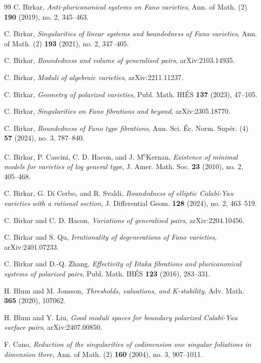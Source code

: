 \documentclass[11pt,reqno]{amsart}
\numberwithin{equation}{section}
\theoremstyle{definition}
\begin{document}
\begin{thebibliography}{99}
 C. Birkar, \textit{Anti-pluricanonical systems on Fano varieties}, Ann. of Math. (2) \textbf{190} (2019), no. 2, 345--463.

 C. Birkar, \textit{Singularities of linear systems and boundedness of Fano varieties}, Ann. of Math. (2) \textbf{193} (2021), no. 2, 347--405.

 C. Birkar, \textit{Boundedness and volume of generalised pairs}, arXiv:2103.14935.

 C. Birkar, \textit{Moduli of algebraic varieties}, arXiv:2211.11237.

 C. Birkar, \textit{Geometry of polarized varieties}, Publ. Math. IH\'ES \textbf{137} (2023), 47--105.

 C. Birkar, \textit{Singularities on Fano fibrations and beyond}, arXiv:2305.18770.

 C. Birkar, \textit{Boundedness of Fano type fibrations}, Ann. Sci. \'Ec. Norm. Sup\'er. (4) \textbf{57} (2024), no. 3, 787--840.

 C. Birkar, P. Cascini, C. D. Hacon, and J. M\textsuperscript{c}Kernan, \textit{Existence of minimal models for varieties of log general type}, J. Amer. Math. Soc. \textbf{23} (2010), no. 2, 405--468.

 C. Birkar, G. Di Cerbo, and R. Svaldi, \textit{Boundedness of elliptic Calabi-Yau varieties with a rational section}, J. Differential Geom. \textbf{128} (2024), no. 2, 463--519.

 C. Birkar and C. D. Hacon, \textit{Variations of generalised pairs}, arXiv:2204.10456.

 C. Birkar and S. Qu, \textit{Irrationality of degenerations of Fano varieties}, arXiv:2401.07233.

 C. Birkar and D.-Q. Zhang, \textit{Effectivity of Iitaka fibrations and pluricanonical systems of polarized pairs}, Publ. Math. IH\'ES \textbf{123} (2016), 283--331.

 H. Blum and M. Jonsson, \textit{Thresholds, valuations, and K-stability}, Adv. Math. \textbf{365} (2020), 107062.

 H. Blum and Y. Liu, \textit{Good moduli spaces for boundary polarized Calabi-Yau surface pairs}, arXiv:2407.00850.

 F. Cano, \textit{Reduction of the singularities of codimension one singular foliations in dimension three}, Ann. of Math. (2) \textbf{160} (2004), no. 3, 907--1011.


\end{thebibliography}
\end{document}
